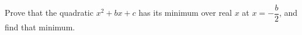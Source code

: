Prove that the quadratic $x^2+bx+c$ has its minimum over real $x$ at $x=-\dfrac{b}{2}$, and find that minimum.
